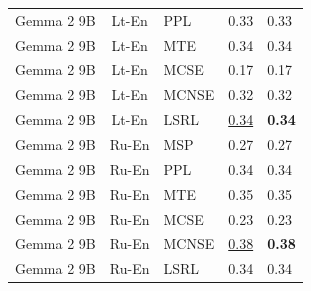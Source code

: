 \begin{table}
\begin{tabular}{lc}
Gemma 2 9B & Lt-En & PPL & 0.33 & 0.33 \\
Gemma 2 9B & Lt-En & MTE & 0.34 & 0.34 \\
Gemma 2 9B & Lt-En & MCSE & 0.17 & 0.17 \\
Gemma 2 9B & Lt-En & MCNSE & 0.32 & 0.32 \\
Gemma 2 9B & Lt-En & LSRL & \underline{0.34} & \textbf{0.34} \\
Gemma 2 9B & Ru-En & MSP & 0.27 & 0.27 \\
Gemma 2 9B & Ru-En & PPL & 0.34 & 0.34 \\
Gemma 2 9B & Ru-En & MTE & 0.35 & 0.35 \\
Gemma 2 9B & Ru-En & MCSE & 0.23 & 0.23 \\
Gemma 2 9B & Ru-En & MCNSE & \underline{0.38} & \textbf{0.38} \\
Gemma 2 9B & Ru-En & LSRL & 0.34 & 0.34 \\
\midrule
\end{tabular}
\end{table}
